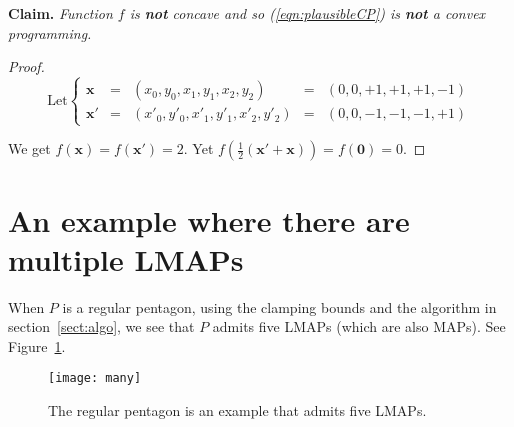 \documentclass{ws-ijcga}
\begin{document}
\bigskip \noindent \textbf{Claim.}
\emph{Function $f$ is \textbf{not} concave and so (\ref{eqn:plausibleCP}) is \textbf{not} a convex programming.}

\begin{proof}
 \begin{equation*}
    \text{Let} \left\{ \begin{array}{ccccc}
              \mathbf{x} & = & (x_0,y_0,x_1,y_1,x_2,y_2) & = & (0,0,+1,+1,+1,-1)\\
              \mathbf{x}' & = & (x'_0,y'_0,x'_1,y'_1,x'_2,y'_2) & = & (0,0,-1,-1,-1,+1)
            \end{array} \right.
 \end{equation*}

We get $f(\mathbf{x})=f(\mathbf{x}')=2$. Yet $f(\frac{1}{2}(\mathbf{x}'+\mathbf{x}))=f(\mathbf{0})=0$.
 \end{proof}

\section{An example where there are multiple LMAPs}\label{sect:many-pentagon}

When $P$ is a regular pentagon, using the clamping bounds and the algorithm in section~\ref{sect:algo},
  we see that $P$ admits five LMAPs (which are also MAPs). See Figure~\ref{fig:many}.

\begin{figure}[h]
  \centering
  \texttt{[image: many]}\\
  \caption{The regular pentagon is an example that admits five LMAPs.}\label{fig:many}
\end{figure}






\end{document}
